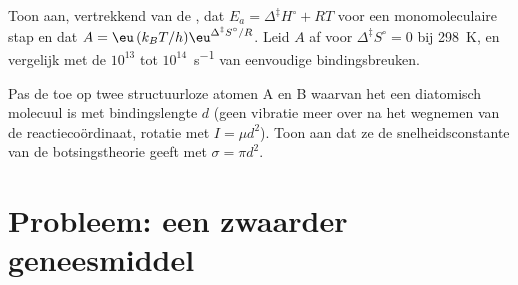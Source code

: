 \begin{exercise}[$\star\star\star$]\label{exo:b3:rate-theories:11}
Toon aan, vertrekkend van de , dat $E_a = \Delta^{\ddagger}H^\circ + RT$ voor een
monomoleculaire stap en dat $A = \eu\,(k_BT/h)\eu^{\Delta^{\ddagger}S^\circ/R}$. Leid $A$ af voor $\Delta^{\ddagger}S^\circ = 0$ bij
\qty{298}{K}, en vergelijk met de $10^{13}$ tot $10^{14}$~\unit{s^{-1}} van
eenvoudige bindingsbreuken.
\end{exercise}

\begin{exercise}[$\star\star\star$]\label{exo:b3:rate-theories:12}
Pas de  toe op twee structuurloze atomen A en B
waarvan het  een diatomisch molecuul is met
bindingslengte $d$ (geen vibratie meer over na het wegnemen van de
reactiecoördinaat, rotatie met $I = \mu d^2$). Toon aan dat ze de
snelheidsconstante van de botsingstheorie geeft met $\sigma = \pi d^2$.
\end{exercise}

\section{Probleem: een zwaarder geneesmiddel}

